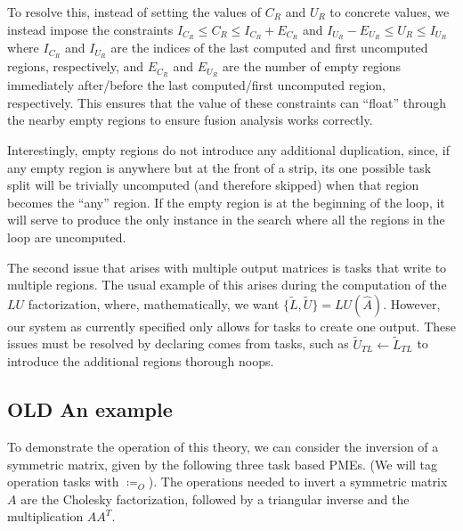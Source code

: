 \documentclass[12pt,letterpaper]{article}
\begin{document}
To resolve this, instead of setting the values of $C_R$ and $U_R$ to concrete values, we instead impose the constraints $I_{C_R} \leq C_R \leq I_{C_R} + E_{C_R}$ and $I_{U_R} - E_{U_R} \leq U_R \leq I_{U_R}$ where $I_{C_R}$ and $I_{U_R}$ are the indices of the last computed and first uncomputed regions, respectively, and $E_{C_R}$ and $E_{U_R}$ are the number of empty regions immediately after/before the last computed/first uncomputed region, respectively.
This ensures that the value of these constraints can ``float'' through the nearby empty regions to ensure fusion analysis works correctly.

Interestingly, empty regions do not introduce any additional duplication, since, if any empty region is anywhere but at the front of a strip, its one possible task split will be trivially uncomputed (and therefore skipped) when that region becomes the ``any'' region.
If the empty region is at the beginning of the loop, it will serve to produce the only instance in the search where all the regions in the loop are uncomputed.

The second issue that arises with multiple output matrices is tasks that write to multiple regions.
The usual example of this arises during the computation of the $LU$ factorization, where, mathematically, we want $\{\widetilde{L}, \widetilde{U}\} = LU(\hat{A})$.
However, our system as currently specified only allows for tasks to create one output.
These issues must be resolved by declaring comes from tasks, such as $\widetilde{U}_{TL} \leftarrow \widetilde{L}_{TL}$ to introduce the additional regions thorough noops.
\subsection{OLD An example}
To demonstrate the operation of this theory, we can consider the inversion of a symmetric matrix, given by the following three task based PMEs. (We will tag operation tasks with $\coloneqq_O$).
The operations needed to invert a symmetric matrix $A$ are the Cholesky factorization, followed by a triangular inverse and the multiplication $AA^{T}$.
\end{document}
